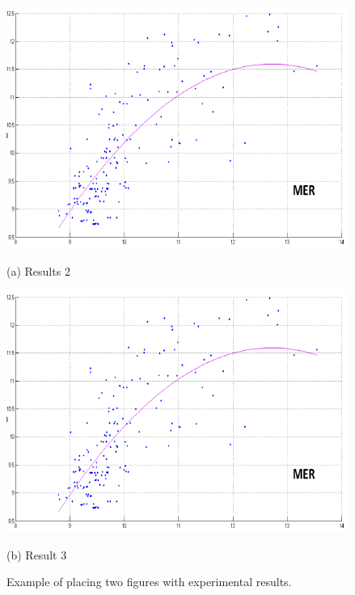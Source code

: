 \documentclass{article}
\begin{document}
\begin{figure}

\begin{minipage}[b]{.48\linewidth}
  \centering
  \includegraphics[width=\columnwidth]{figure.png}
  \centerline{(a) Results 2}\medskip
\end{minipage}
\hfill
\begin{minipage}[b]{0.48\linewidth}
  \centering
  \includegraphics[width=\columnwidth]{figure.png}
  \centerline{(b) Result 3}\medskip
\end{minipage}
%
\caption{Example of placing two figures with experimental results.}
\label{fig:res}
%
\end{figure}
\end{document}
